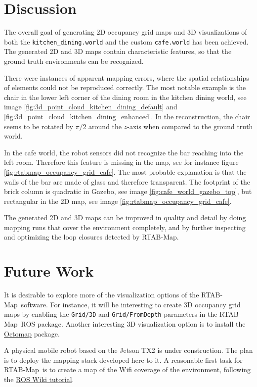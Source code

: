 \documentclass[10pt, journal, compsoc]{IEEEtran}
\newcommand{\rtab}{RTAB-Map}
\begin{document}
\section{Discussion}
\label{sec:discussion}
The overall goal of generating 2D occupancy grid maps and 3D visualizations of both the \texttt{kitchen\_dining.world} and the custom \texttt{cafe.world} has been achieved. The generated 2D and 3D maps contain characteristic features, so that the ground truth environments can be recognized. 

There were instances of apparent mapping errors, where the spatial relationships of elements could not be reproduced correctly. The most notable example is the chair in the lower left corner of the dining room in the kitchen dining world, see image \ref{fig:3d_point_cloud_kitchen_dining_default} and \ref{fig:3d_point_cloud_kitchen_dining_enhanced}. In the reconstruction, the chair seems to be rotated by $\pi/2$ around the $z$-axis when compared to the ground truth world.

In the cafe world, the robot sensors did not recognize the bar reaching into the left room. Therefore this feature is missing in the map, see for instance figure \ref{fig:rtabmap_occupancy_grid_cafe}. The most probable explanation is that the walls of the bar are made of glass and therefore transparent. The footprint of the brick column is quadratic in Gazebo, see image \ref{fig:cafe_world_gazebo_top}, but rectangular in the 2D map, see image \ref{fig:rtabmap_occupancy_grid_cafe}.

The generated 2D and 3D maps can be improved in quality and detail by doing mapping runs that cover the environment completely, and by further inspecting and optimizing the loop closures detected by \rtab .

\section{Future Work}
\label{sec:future_work}
It is desirable to explore more of the visualization options of the \rtab\ software. For instance, it will be interesting to create 3D occupancy grid maps by enabling the \texttt{Grid/3D} and \texttt{Grid/FromDepth} parameters in the \rtab\ ROS package. Another interesting 3D visualization option is to install the \href{https://octomap.github.io/}{Octomap} package.

A physical mobile robot based on the Jetson TX2 is under construction. The plan is to deploy the mapping stack developed here to it. A reasonable first task for \rtab\ is to create a map of the Wifi coverage of the environment, following the \href{http://wiki.ros.org/rtabmap_ros/Tutorials/WifiSignalStrengthMappingUserDataUsage}{ROS Wiki tutorial}. 
\end{document}
